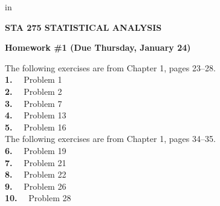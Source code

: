 \hoffset=0in
\voffset=0in
\topmargin -1.0in
\headheight 0.0in
 in 
\footheight 0.0in
\footskip 0.0in
\oddsidemargin -0.0in
\evensidemargin 0.0in 
\textwidth 6.5in




\pagestyle{empty}

\vspace*{0.4in}

\centerline{\bf STA 275 STATISTICAL ANALYSIS} 
\centerline{\bf Homework \#1 (Due Thursday, January 24)} 

\vspace*{0.5in}

\parindent 0pt

The following exercises are from Chapter 1, pages 23--28. \\

{\bf 1.} \ \ Problem 1 \\
{\bf 2.} \ \ Problem 2 \\
{\bf 3.} \ \ Problem 7 \\
{\bf 4.} \ \ Problem 13 \\
{\bf 5.} \ \ Problem 16 \\

The following exercises are from Chapter 1, pages 34--35. \\

{\bf 6.} \ \ Problem 19 \\
{\bf 7.} \ \ Problem 21 \\
{\bf 8.} \ \ Problem 22 \\
{\bf 9.} \ \ Problem 26 \\
{\bf 10.} \ \ Problem 28


